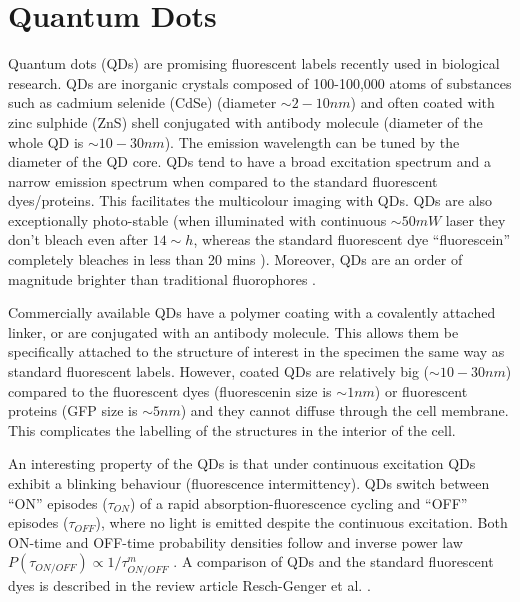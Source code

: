 \section{Quantum Dots\label{sec:Quantum-dots}}

Quantum dots (QDs) are promising fluorescent labels recently used in biological research.  QDs are inorganic crystals composed of 100-100,000 atoms of substances such as cadmium selenide (CdSe)  (diameter $\sim2-10\unit{nm}$) \cite{Alivisatos1996} and often coated with zinc sulphide (ZnS) shell conjugated with antibody molecule (diameter of the whole QD is $\sim10-30\unit{nm}$). The emission wavelength can be tuned by the diameter of the QD core. QDs tend to have a broad excitation spectrum and a narrow emission spectrum when compared to the standard fluorescent dyes/proteins. This facilitates the multicolour imaging with QDs. QDs are also exceptionally photo-stable (when illuminated with continuous $\sim 50\unit{mW}$ laser they don't bleach even after $14\sim\unit{h}$, whereas the standard fluorescent dye ``fluorescein'' completely bleaches in less than 20 mins \cite{Jaiswal2004}). Moreover, QDs are an order of magnitude brighter than traditional fluorophores \cite{Resch-Genger2008,Walling2009}. 

Commercially available QDs have a polymer coating with a covalently attached linker, or are conjugated with an antibody molecule. This allows them be specifically attached to the structure of interest in the specimen the same way as standard fluorescent labels. However, coated QDs are relatively big ($\sim10-30\unit{nm}$) compared to the fluorescent dyes (fluorescenin size is $\sim1\unit{nm}$) or fluorescent proteins (GFP size is $\sim5\unit{nm}$) and they cannot diffuse through the cell membrane. This complicates the labelling of the structures in the interior of the cell. 

An interesting property of the QDs is that under continuous excitation QDs exhibit a blinking behaviour (fluorescence intermittency). QDs switch between ``ON'' episodes ($\tau_{ON}$) of a rapid absorption-fluorescence cycling and ``OFF'' episodes ($\tau_{OFF}$), where no light is emitted despite the continuous excitation. Both ON-time and OFF-time probability densities follow and inverse power law $P(\tau_{ON/OFF})\propto1/\tau_{ON/OFF}^{m}$ \cite{Kuno2001, Stefani2009}. A comparison of QDs and the standard fluorescent dyes is described in the review article Resch-Genger et al. \cite{Resch-Genger2008}.


